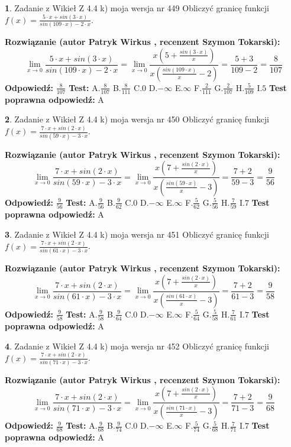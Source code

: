 \documentclass[12pt, a4paper]{article}
\theoremstyle{definition} %
\newtheorem{zad}{}
\newcommand{\zadStart}[1]{\begin{zad}#1\newline}
\newcommand{\zadStop}{\end{zad}}
\newcommand{\rozwStart}[2]{\noindent \textbf{Rozwiązanie (autor #1 , recenzent #2): }\newline}
\newcommand{\rozwStop}{\newline}
\newcommand{\odpStart}{\noindent \textbf{Odpowiedź:}\newline}
\newcommand{\odpStop}{\newline}
\newcommand{\testStart}{\noindent \textbf{Test:}\newline}
\newcommand{\testStop}{\newline}
\newcommand{\kluczStart}{\noindent \textbf{Test poprawna odpowiedź:}\newline}
\newcommand{\kluczStop}{\newline}
\begin{document}
\zadStart{Zadanie z Wikieł Z 4.4 k) moja wersja nr 449}
Obliczyć granicę funkcji $f(x)=\frac{5\cdot x +sin(3\cdot x)}{sin(109\cdot x) -2\cdot x}$.
\zadStop
\rozwStart{Patryk Wirkus}{Szymon Tokarski}
$$\lim\limits_{x\to 0}\frac{5\cdot x +sin(3\cdot x)}{sin(109\cdot x) -2\cdot x}
=\lim\limits_{x\to 0}\frac{x(5+\frac{sin(3\cdot x)}{x})}{x(\frac{sin(109\cdot x)}{x}-2)}
=\frac{5+3}{109-2} = \frac{8}{107}$$
\rozwStop
\odpStart
$\frac{8}{107}$
\odpStop
\testStart
A.$\frac{8}{107}$
B.$\frac{8}{111}$
C.$0$
D.$-\infty$
E.$\infty$
F.$\frac{2}{111}$
G.$\frac{2}{107}$
H.$\frac{5}{109}$
I.$5$
\testStop
\kluczStart
A
\kluczStop



\zadStart{Zadanie z Wikieł Z 4.4 k) moja wersja nr 450}
Obliczyć granicę funkcji $f(x)=\frac{7\cdot x +sin(2\cdot x)}{sin(59\cdot x) -3\cdot x}$.
\zadStop
\rozwStart{Patryk Wirkus}{Szymon Tokarski}
$$\lim\limits_{x\to 0}\frac{7\cdot x +sin(2\cdot x)}{sin(59\cdot x) -3\cdot x}
=\lim\limits_{x\to 0}\frac{x(7+\frac{sin(2\cdot x)}{x})}{x(\frac{sin(59\cdot x)}{x}-3)}
=\frac{7+2}{59-3} = \frac{9}{56}$$
\rozwStop
\odpStart
$\frac{9}{56}$
\odpStop
\testStart
A.$\frac{9}{56}$
B.$\frac{9}{62}$
C.$0$
D.$-\infty$
E.$\infty$
F.$\frac{5}{62}$
G.$\frac{5}{56}$
H.$\frac{7}{59}$
I.$7$
\testStop
\kluczStart
A
\kluczStop



\zadStart{Zadanie z Wikieł Z 4.4 k) moja wersja nr 451}
Obliczyć granicę funkcji $f(x)=\frac{7\cdot x +sin(2\cdot x)}{sin(61\cdot x) -3\cdot x}$.
\zadStop
\rozwStart{Patryk Wirkus}{Szymon Tokarski}
$$\lim\limits_{x\to 0}\frac{7\cdot x +sin(2\cdot x)}{sin(61\cdot x) -3\cdot x}
=\lim\limits_{x\to 0}\frac{x(7+\frac{sin(2\cdot x)}{x})}{x(\frac{sin(61\cdot x)}{x}-3)}
=\frac{7+2}{61-3} = \frac{9}{58}$$
\rozwStop
\odpStart
$\frac{9}{58}$
\odpStop
\testStart
A.$\frac{9}{58}$
B.$\frac{9}{64}$
C.$0$
D.$-\infty$
E.$\infty$
F.$\frac{5}{64}$
G.$\frac{5}{58}$
H.$\frac{7}{61}$
I.$7$
\testStop
\kluczStart
A
\kluczStop



\zadStart{Zadanie z Wikieł Z 4.4 k) moja wersja nr 452}
Obliczyć granicę funkcji $f(x)=\frac{7\cdot x +sin(2\cdot x)}{sin(71\cdot x) -3\cdot x}$.
\zadStop
\rozwStart{Patryk Wirkus}{Szymon Tokarski}
$$\lim\limits_{x\to 0}\frac{7\cdot x +sin(2\cdot x)}{sin(71\cdot x) -3\cdot x}
=\lim\limits_{x\to 0}\frac{x(7+\frac{sin(2\cdot x)}{x})}{x(\frac{sin(71\cdot x)}{x}-3)}
=\frac{7+2}{71-3} = \frac{9}{68}$$
\rozwStop
\odpStart
$\frac{9}{68}$
\odpStop
\testStart
A.$\frac{9}{68}$
B.$\frac{9}{74}$
C.$0$
D.$-\infty$
E.$\infty$
F.$\frac{5}{74}$
G.$\frac{5}{68}$
H.$\frac{7}{71}$
I.$7$
\testStop
\kluczStart
A
\kluczStop
\end{document}
